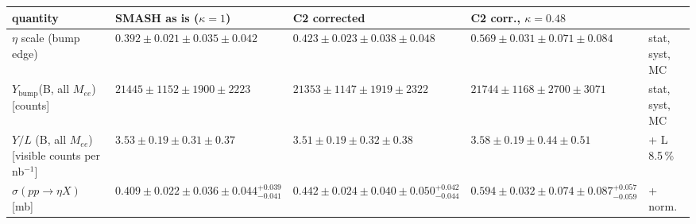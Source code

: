 \begin{tabular}{lllll}
\hline
 quantity & SMASH as is ($\kappa=1$) & C2 corrected & C2 corr., $\kappa=0.48$ & \\
\hline
 $\eta$ scale (bump edge) & $0.392\pm0.021\pm0.035\pm0.042$ & $0.423\pm0.023\pm0.038\pm0.048$ & $0.569\pm0.031\pm0.071\pm0.084$ & stat, syst, MC \\
 $Y_{\mathrm{bump}}$(B, all $M_{ee}$) [counts] & $21445\pm1152\pm1900\pm2223$ & $21353\pm1147\pm1919\pm2322$ & $21744\pm1168\pm2700\pm3071$ & stat, syst, MC \\
 $Y/L$ (B, all $M_{ee}$) [visible counts per nb$^{-1}$] & $3.53\pm0.19\pm0.31\pm0.37$ & $3.51\pm0.19\pm0.32\pm0.38$ & $3.58\pm0.19\pm0.44\pm0.51$ & + L 8.5\,\% \\
 $\sigma(pp\to\eta X)$ [mb] & $0.409\pm0.022\pm0.036\pm0.044^{+0.039}_{-0.041}$ & $0.442\pm0.024\pm0.040\pm0.050^{+0.042}_{-0.044}$ & $0.594\pm0.032\pm0.074\pm0.087^{+0.057}_{-0.059}$ & + norm. \\
\hline
\end{tabular}
